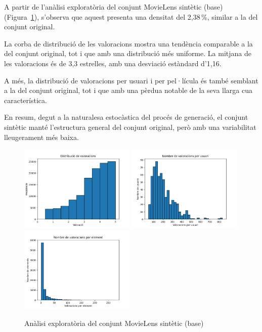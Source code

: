 \documentclass[a4paper,12pt]{report}
\begin{document}
A partir de l’anàlisi exploratòria del conjunt MovieLens sintètic (base) (Figura~\ref{fig:analisis_ml_synthetic_base}), s’observa que aquest presenta una densitat del 2,38\,\%, similar a la del conjunt original.

La corba de distribució de les valoracions mostra una tendència comparable a la del conjunt original, tot i que amb una distribució més uniforme. La mitjana de les valoracions és de 3,3 estrelles, amb una desviació estàndard d’1,16.

A més, la distribució de valoracions per usuari i per pel·lícula és també semblant a la del conjunt original, tot i que amb una pèrdua notable de la seva llarga cua característica.

En resum, degut a la naturalesa estocàstica del procés de generació, el conjunt sintètic manté l’estructura general del conjunt original, però amb una variabilitat lleugerament més baixa.

\begin{figure} [H]
    \centering
    \includegraphics[width=0.49\textwidth]{Figuras/syn-ratings.png}
    \hfill
    \includegraphics[width=0.49\textwidth]{Figuras/syn-users.png}
    \hfill
    \includegraphics[width=0.49\textwidth]{Figuras/syn-items.png}
    \caption{Anàlisi exploratòria del conjunt MovieLens sintètic (base)}
    \label{fig:analisis_ml_synthetic_base}
\end{figure}
\end{document}
